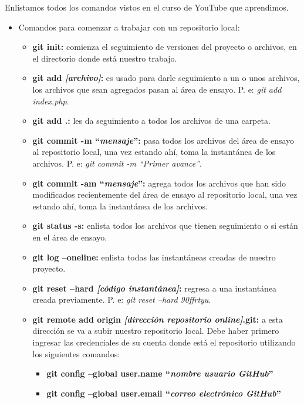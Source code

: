 Enlistamos todos los comandos vistos en el curso de YouTube que aprendimos.
\begin{itemize}
    \item Comandos para comenzar a trabajar con un repositorio local:
    \begin{itemize}
        \item \textbf{git init:} comienza el seguimiento de versiones del proyecto o archivos, en el directorio donde está nuestro trabajo.
        \item \textbf{git add \textit{[archivo]}:} es usado para darle seguimiento a un o unos archivos, los archivos que sean agregados pasan al área de ensayo. P. e: \textit{git add index.php}.
        \item \textbf{git add .: }les da seguimiento a todos los archivos de una carpeta.
        \item \textbf{git commit -m “\textit{mensaje}”:} pasa todos los archivos del área de ensayo al repositorio local, una vez estando ahí, toma la instantánea de los archivos. P. e: \textit{git commit -m “Primer avance”}.
        \item \textbf{git commit -am “\textit{mensaje}”:} agrega todos los archivos que han sido modificados recientemente del área de ensayo al repositorio local, una vez estando ahí, toma la instantánea de los archivos.
        \item \textbf{git status -s: }enlista todos los archivos que tienen seguimiento o si están en el área de ensayo.
        \item \textbf{git log –oneline: }enlista todas las instantáneas creadas de nuestro proyecto.
        \item \textbf{git reset –hard \textit{[código instantánea]}:} regresa a una instantánea creada previamente. P. e: \textit{git reset –hard 90ffrtyu}.
        \item \textbf{git remote add origin \textit{[dirección repositorio online]}.git:} a esta dirección se va a subir nuestro repositorio local. Debe haber primero ingresar las credenciales de su cuenta donde está el repositorio utilizando los siguientes comandos:
        \begin{itemize}
            \item \textbf{git config –global user.name “\textit{nombre usuario GitHub}”}
            \item \textbf{git config –global user.email “\textit{correo electrónico GitHub}”}
        \end{itemize}
    \end{itemize}

\end{itemize}
